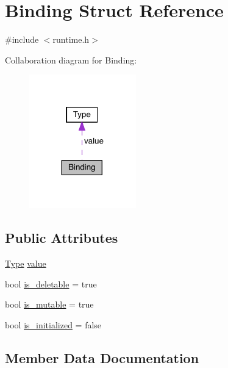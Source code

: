 \hypertarget{struct_binding}{}\section{Binding Struct Reference}
\label{struct_binding}


{\ttfamily \#include $<$runtime.\+h$>$}



Collaboration diagram for Binding\+:
\nopagebreak
\begin{figure}[H]
\begin{center}
\leavevmode
\includegraphics[width=131pt]{struct_binding__coll__graph}
\end{center}
\end{figure}
\subsection*{Public Attributes}
\begin{DoxyCompactItemize}
\item 
\hyperlink{class_type}{Type} \hyperlink{struct_binding_a71c0f96fe4d74ab7cd7e61c0609a3c4c}{value}
\item 
bool \hyperlink{struct_binding_af14c764fbd856958c8c13db394f7f30b}{is\+\_\+deletable} = true
\item 
bool \hyperlink{struct_binding_a0a6daae772f7935ec9b2ecd3d7c8b260}{is\+\_\+mutable} = true
\item 
bool \hyperlink{struct_binding_aae232d870009e0669bf9d81229eafa80}{is\+\_\+initialized} = false
\end{DoxyCompactItemize}


\subsection{Member Data Documentation}
\mbox{\label{struct_binding_af14c764fbd856958c8c13db394f7f30b}} 
